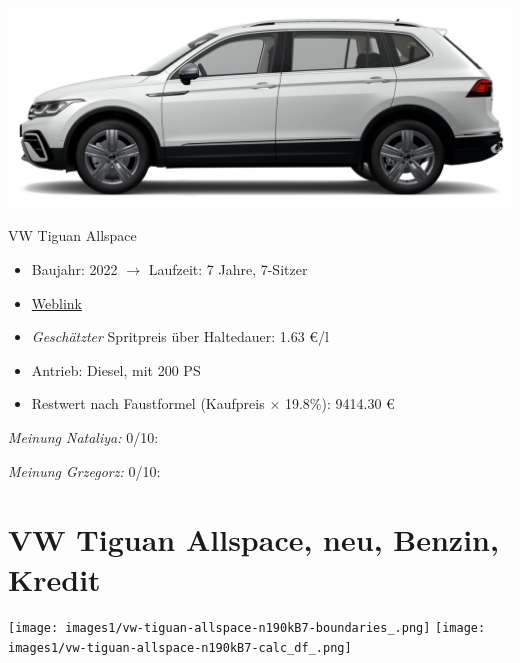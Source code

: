 \documentclass[landscape, DIV=99, 14pt]{scrartcl}
\begin{document}
\pagebreak
\begin{center}
\includegraphics[width=0.9\columnwidth]{cars/vw-tiguan-diesel.png}

VW Tiguan Allspace
\end{center}

\begin{itemize}
    \item Baujahr: 2022 $\rightarrow$ Laufzeit: 7 Jahre, 7-Sitzer
    \item \href{https://www.volkswagen.de/de/konfigurator.html/__app/der-neue-tiguan-allspace/der-tiguan-allspace---standardmodelle/elegance.app?buildabilityStatus-app=buildable&category-app=private&carlineId-app=31160&salesGroupId-app=32700&trimName-app=Elegance&modelId-app=BJ247T%24GYORYOR&modelVersion-app=2&modelYear-app=2022&exteriorId-app=F14+0Q0Q&interiorId-app=F56+++++BG&options-app=GWBAWBA-GPG4PG4-MAHV1M6-GPFCPFC-GRBDRBD-MKSUKA2}{Weblink}
    \item \emph{Gesch\"atzter} Spritpreis \"uber Haltedauer: 1.63 \euro{}/l
    \item Antrieb: Diesel, mit 200 PS
    \item Restwert nach Faustformel (Kaufpreis $\times$ 19.8\%): 9414.30 \euro{}
\end{itemize}

\begin{small}
\emph{Meinung Nataliya:} 0/10: 
        
\emph{Meinung Grzegorz:} 0/10: 
\end{small}

\pagebreak


\twocolumn

\section*{VW Tiguan Allspace, neu, Benzin, Kredit}
\begin{center}
\texttt{[image: images1/vw-tiguan-allspace-n190kB7-boundaries\_.png]}
\null
\vspace{0.5cm}
\texttt{[image: images1/vw-tiguan-allspace-n190kB7-calc\_df\_.png]}
\end{center}
\end{document}
